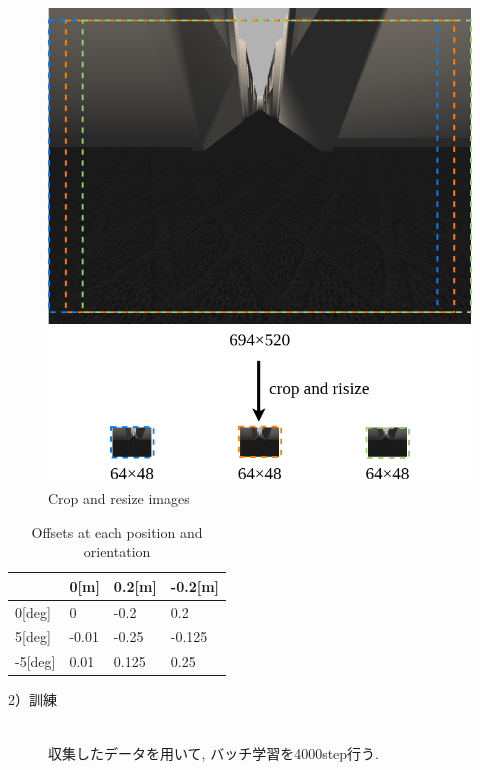 \begin{figure}[h]
  \centering
  \includegraphics[keepaspectratio, scale=0.35]{images/crop.png}
  \caption{Crop and resize images}
  \label{Fig:crop}
\end{figure}

\begin{table}[h]
  \centering
  \caption{Offsets at each position and orientation}
  \begin{tabular}{|p{2cm}|p{2cm}|p{2cm}|p{2cm}|} \hline
      & 0[m] & 0.2[m] & -0.2[m] \\ \hline
    0[deg] & 0 & -0.2 & 0.2 \\ \hline
    5[deg] & -0.01 & -0.25 & -0.125 \\ \hline
    -5[deg] & 0.01 & 0.125 & 0.25 \\ \hline
  \end{tabular}
  \label{tb:offset}
\end{table}

\newpage
\begin{description}
  \item[2）訓練]\mbox{}\\ \hspace*{3mm}収集したデータを用いて, バッチ学習を4000step行う. 
\end{description}

